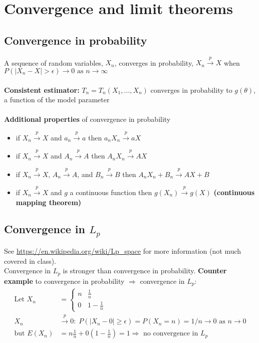 \documentclass{article}
\newcommand{\abs}[1]{\lvert#1\rvert}
\begin{document}
\section{Convergence and limit theorems}
\subsection{Convergence in probability}
A sequence of random variables, $X_n$, converges in probability, $X_n \overset{p}{\longrightarrow} X$ when
$P(\abs{X_n - X} > \epsilon) \longrightarrow 0 \textrm{ as } n \longrightarrow \infty$\\\\
\textbf{Consistent estimator:} $T_n = T_n(X_1, \dots, X_n)$ converges in probability to $g(\theta)$, a function of the model parameter\\\\
\textbf{Additional properties} of convergence in probability
\begin{itemize}
    \item if $X_n \overset{p}{\longrightarrow} X$ and $a_n \overset{p}{\longrightarrow} a$ then $a_nX_n \overset{p}{\longrightarrow} aX$
    \item if $X_n \overset{p}{\longrightarrow} X$ and $A_n \overset{p}{\longrightarrow} A$ then $A_nX_n \overset{p}{\longrightarrow} AX$
    \item if $X_n \overset{p}{\longrightarrow} X$, $A_n \overset{p}{\longrightarrow} A$, and $B_n \overset{p}{\longrightarrow} B$ then $A_nX_n + B_n \overset{p}{\longrightarrow} AX + B$
    \item if $X_n \overset{p}{\longrightarrow} X$ and $g$ a continuous function then $g(X_n) \overset{p}{\longrightarrow} g(X)$ \textbf{(continuous mapping theorem)}
\end{itemize}

\subsection{Convergence in $L_p$}
See \url{https://en.wikipedia.org/wiki/Lp_space} for more information (not much covered in class).\\
Convergence in $L_p$ is stronger than convergence in probability. 
\textbf{Counter example} to convergence in probability $\Longrightarrow$ convergence in $L_p$:
\begin{align*}
    \textrm{Let } X_n &= \begin{cases}
        n & \frac{1}{n}\\
        0 & 1 - \frac{1}{n}
    \end{cases}\\
    X_n &\overset{p}{\longrightarrow} 0: \; P(\abs{X_n - 0} \geq \epsilon) = P(X_n = n) = 1/n \longrightarrow 0 \textrm{ as } n \longrightarrow 0\\
    \textrm{but } E(X_n) &= n\frac{1}{n} + 0(1 - \frac{1}{n}) = 1 \Longrightarrow \textrm{ no convergence in } L_p
\end{align*}
\end{document}
